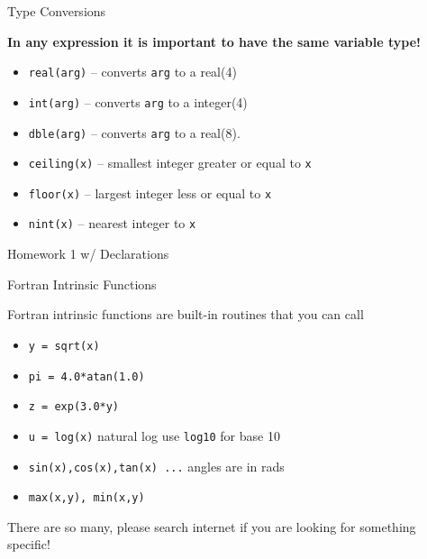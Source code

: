 \documentclass{beamer}
\begin{document}
\begin{frame}{Type Conversions}

\textbf{In any expression it is important to have the same variable type!}
\vfill
  \begin{itemize}
    \item\texttt{real(arg)} -- converts \texttt{arg} to a real(4)
    \vfill\item\texttt{int(arg)} -- converts \texttt{arg} to a integer(4)
    \vfill\item\texttt{dble(arg)} -- converts \texttt{arg} to a real(8).
    \vfill\item\texttt{ceiling(x)} -- smallest integer greater or equal to \texttt{x}
    \vfill\item\texttt{floor(x)} -- largest integer less or equal to \texttt{x}
    \vfill\item\texttt{nint(x)} -- nearest integer to \texttt{x}
  \end{itemize}

\end{frame}
\begin{frame}[allowframebreaks]{Homework 1 w/ Declarations}
\begin{scriptsize}
  
\end{scriptsize}
\end{frame}
\begin{frame}{Fortran Intrinsic Functions}

Fortran intrinsic functions are built-in routines that you can call
\vfill
\begin{itemize}
  \item \texttt{y = sqrt(x)}
  \vfill\item \texttt{pi = 4.0*atan(1.0)}
  \vfill\item \texttt{z = exp(3.0*y)}
  \vfill\item \texttt{u = log(x)} natural log use \texttt{log10} for base 10
  \vfill\item \texttt{sin(x),cos(x),tan(x) ...} {\color{red}angles are in rads}
  \vfill\item \texttt{max(x,y), min(x,y)}
\end{itemize}
\vfill
There are so many, please search internet if you are looking for something specific!
\end{frame}
\end{document}
